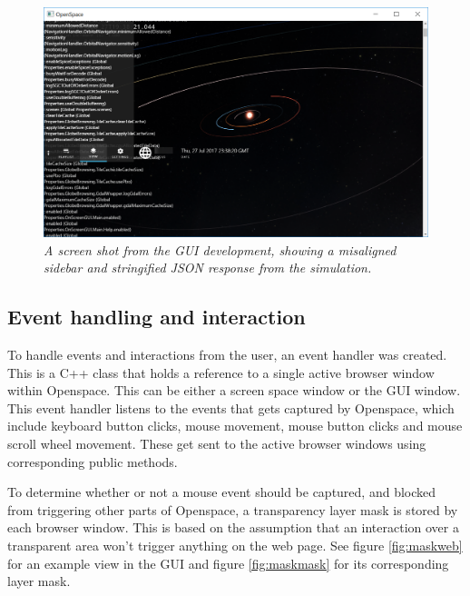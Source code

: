 \begin{figure}[!h]
\centering
\includegraphics[width=0.7\linewidth]{./figures/guiprocess.png}
\caption{\emph{A screen shot from the GUI development, showing a misaligned sidebar and stringified JSON response from the simulation.}}\label{fig:guiprocess}
\end{figure}

\subsection{Event handling and interaction}\label{sec:interaction}

To handle events and interactions from the user, an event handler was created. This is a C++ class that holds a reference to a single active browser window within Openspace. This can be either a screen space window or the GUI window. This event handler listens to the events that gets captured by Openspace, which include keyboard button clicks, mouse movement, mouse button clicks and mouse scroll wheel movement. These get sent to the active browser windows using corresponding public methods.

To determine whether or not a mouse event should be captured, and blocked from triggering other parts of Openspace, a transparency layer mask is stored by each browser window. This is based on the assumption that an interaction over a transparent area won't trigger anything on the web page. See figure \ref{fig:maskweb} for an example view in the GUI and figure \ref{fig:maskmask} for its corresponding layer mask.

